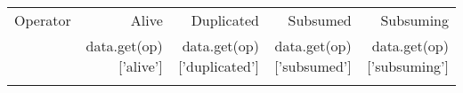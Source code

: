 \begin{tabular}{lrrrr}
    \toprule
    Operator & Alive & Duplicated & Subsumed & Subsuming \\
    {%
    \midrule
      {%
        {%
            {%
            {{ op }} & {{ data.get(op)['alive'] }} & {{ data.get(op)['duplicated']}} & {{ data.get(op)['subsumed'] }} & {{ data.get(op)['subsuming'] }} \\
            {%
        {%
      {%
    {%
    \bottomrule
\end{tabular}